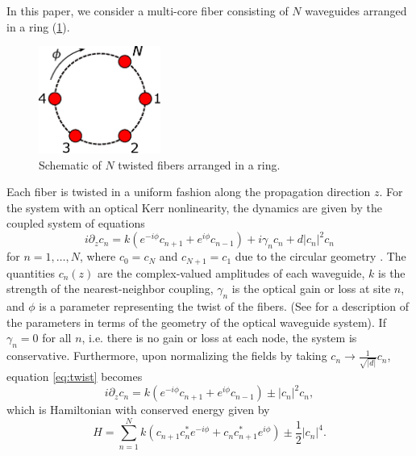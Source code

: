 \documentclass[12pt,reqno]{amsart}
\def\noi{\noindent}
\begin{document}
In this paper, we consider a multi-core fiber consisting of $N$ waveguides arranged in a ring (\cref{fig:ring}).
\begin{figure}[H]
\begin{center}
\includegraphics[width=4cm]{circle}
\end{center}
\caption{Schematic of $N$ twisted fibers arranged in a ring.}
\label{fig:ring}
\end{figure}
\noi Each fiber is twisted in a uniform fashion along the propagation direction $z$. For the system with an optical Kerr nonlinearity, the dynamics are given by the coupled system of equations
\begin{equation}\label{eq:twist}
i \partial_z c_n = k \left(e^{-i\phi}c_{n+1} + e^{i\phi}c_{n-1}\right) + i \gamma_n c_n + d |c_n|^2 c_n
\end{equation}
for $n = 1, \dots, N$, where $c_0 = c_{N}$ and $c_{N+1} = c_1$ due to the circular geometry \cite{castro2016,Parto2017}. The quantities $c_n(z)$ are the complex-valued amplitudes of each waveguide, $k$ is the strength of the nearest-neighbor coupling, $\gamma_n$ is the optical gain or loss at site $n$, and $\phi$ is a parameter representing the twist of the fibers. (See \cite[section 2]{castro2016} for a description of the parameters in terms of the geometry of the optical waveguide system). If $\gamma_n = 0$ for all $n$, i.e. there is no gain or loss at each node, the system is conservative. Furthermore, upon normalizing the fields by taking $c_n \rightarrow \frac{1}{\sqrt{|d|}}c_n$,  equation \cref{eq:twist} becomes
\begin{equation}\label{eq:twist1}
i \partial_z c_n = k \left(e^{-i\phi}c_{n+1} + e^{i\phi}c_{n-1}\right)  \pm |c_n|^2 c_n,
\end{equation}
which is Hamiltonian with conserved energy given by
\begin{equation}
H = \sum_{n=1}^N k (c_{n+1}c_n^* e^{-i \phi} + c_n c_{n+1}^* e^{i \phi}) \pm \frac{1}{2}|c_n|^4.
\end{equation}
\end{document}
